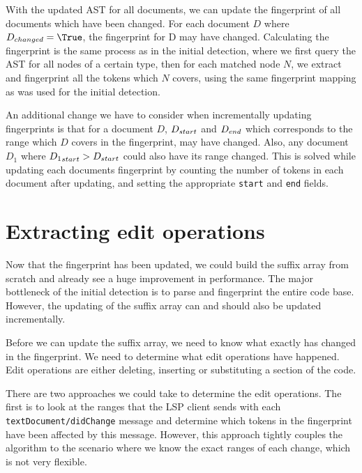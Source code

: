 With the updated AST for all documents, we can update the fingerprint of all documents
which have been changed. For each document $D$ where $\Access{D}{changed} = \True$, the
fingerprint for D may have changed. Calculating the fingerprint is the same process as in
the initial detection, where we first query the AST for all nodes of a certain type, then
for each matched node $N$, we extract and fingerprint all the tokens which $N$ covers,
using the same fingerprint mapping as was used for the initial detection.

An additional change we have to consider when incrementally updating fingerprints is that
for a document $D$, ${{D}_{start}}$ and ${{D}_{end}}$ which corresponds to the
range which $D$ covers in the fingerprint, may have changed. Also, any document $D_1$
where ${{D_1}_{start}} > {{D}_{start}}$ could also have its range changed. This is
solved while updating each documents fingerprint by counting the number of tokens in each
document after updating, and setting the appropriate \verb|start| and \verb|end| fields.



\section{Extracting edit operations}

Now that the fingerprint has been updated, we could build the suffix array from scratch
and already see a huge improvement in performance. The major bottleneck of the initial
detection is to parse and fingerprint the entire code base. However, the updating of the
suffix array can and should also be updated incrementally.

Before we can update the suffix array, we need to know what exactly has changed in the
fingerprint. We need to determine what edit operations have happened. Edit operations are
either deleting, inserting or substituting a section of the code.

There are two approaches we could take to determine the edit operations. The first is to
look at the ranges that the LSP client sends with each \verb|textDocument/didChange|
message and determine which tokens in the fingerprint have been affected by this message.
However, this approach tightly couples the algorithm to the scenario where we know the exact
ranges of each change, which is not very flexible.

